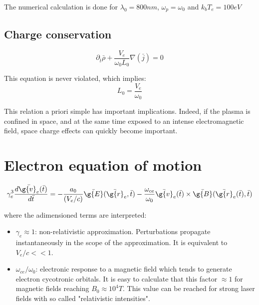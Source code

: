 \noindent The numerical calculation is done for $\lambda_0 = 800nm$, $\omega_p = \omega_0$ and $k_bT_e = 100 eV$


\subsection{Charge conservation}

\begin{equation}
\partial_{\bar{t}}\bar{\rho} + \frac{V_e}{\omega_0L_0} \nabla (\bar{j}) =0
\end{equation}

\noindent This equation is never violated, which implies: 
$$
L_0 = \frac{V_e}{\omega_0}  
$$

\noindent This relation a priori simple has important implications. Indeed, if the plasma is confined in space,
 and at the same time exposed to an intense electromagnetic field, space charge effects can quickly become important.


\section{Electron equation of motion}\label{section:Electron equation of motion}

\begin{equation}
\label{eq:RelativisticEqMotion}
\gamma_e^3 \frac{d\bar{\g{v}_e}(\bar{t})}{d\bar{t}}  = -\frac{a_0}{ (V_e/c)}\bar{\g{E}}(\bar{\g{r}}_e,\bar{t}) - \frac{\omega_{ce}}{ \omega_0} \bar{\g{v}}_e(\bar{t})\times \bar{\g{B}}(\bar{\g{r}}_e(\bar{t}),\bar{t})
\end{equation}

\noindent where the adimensioned terms are interpreted:\\

\begin{itemize}
\item $\gamma_e \approx 1$: non-relativistic approximation. Perturbations propagate instantaneously in the scope of the approximation. It is equivalent to $V_e/c <<1$.
\item $\omega_{ce}/\omega_0$: electronic response to a magnetic field which tends to generate electron cycotronic orbitals. It is easy to calculate that this factor $\approx 1$ for magnetic fields reaching $B_0 \approx 10^4 T$. This value can be reached for strong laser fields with so called "relativistic intensities".
\end{itemize}

\vspace{0.1 in}

